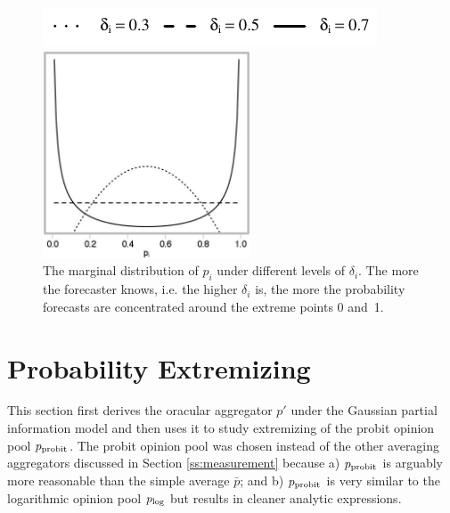 \documentclass[11pt]{article}
\theoremstyle{definition}
\theoremstyle{definition}
\def\probit{p_{\rm probit}}
\def\plog{p_{\rm log}}
\begin{document}
\begin{figure}[t]
\centering
	\hspace{0em}\includegraphics{LegendMarginal}

 \includegraphics[width= 0.55\textwidth]{Marginals}
   \caption{The marginal distribution of $p_i$ under different levels of 
$\delta_i$.  The more the forecaster knows, i.e. the higher $\delta_i$ is, 
the more the probability forecasts are concentrated around the extreme 
points 0 and~1.}
\label{marginals}
\end{figure}

\section{Probability Extremizing}
\label{extremizing}
This section first derives the oracular aggregator $p'$ under the
Gaussian partial information model and then uses it to study
extremizing of the probit opinion pool $\probit$. The probit opinion 
pool was chosen instead of the other averaging aggregators discussed 
in Section \ref{ss:measurement} because a) $\probit$ is arguably more
reasonable than the simple average $\bar{p}$; and b) $\probit$ is very
similar to the logarithmic opinion pool $\plog$ but results in cleaner
analytic expressions. 
\end{document}
